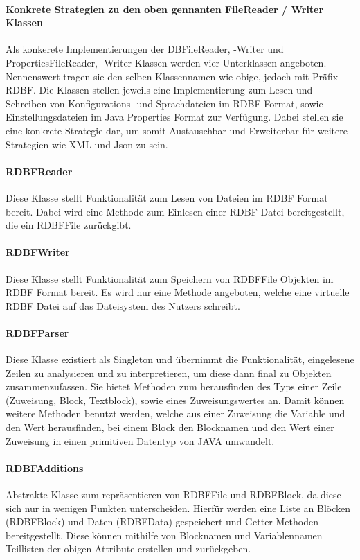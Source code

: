 \documentclass[parskip=full]{scrartcl}
\begin{document}
\paragraph{Konkrete Strategien zu den oben gennanten FileReader / Writer Klassen}
Als konkerete Implementierungen der DBFileReader, -Writer und PropertiesFileReader, -Writer Klassen werden vier Unterklassen angeboten.
Nennenswert tragen sie den selben Klassennamen wie obige, jedoch mit Präfix RDBF.
Die Klassen stellen jeweils eine Implementierung zum Lesen und Schreiben von Konfigurations- und Sprachdateien im RDBF Format, sowie Einstellungsdateien im Java Properties Format zur Verfügung.
Dabei stellen sie eine konkrete Strategie dar, um somit Austauschbar und Erweiterbar für weitere Strategien wie XML und Json zu sein.

\paragraph{RDBFReader}
Diese Klasse stellt Funktionalität zum Lesen von Dateien im RDBF Format bereit.
Dabei wird eine Methode zum Einlesen einer RDBF Datei bereitgestellt, die ein RDBFFile zurückgibt.
\paragraph{RDBFWriter}
Diese Klasse stellt Funktionalität zum Speichern von RDBFFile Objekten im RDBF Format bereit.
Es wird nur eine Methode angeboten, welche eine virtuelle RDBF Datei auf das Dateisystem des Nutzers schreibt.
\paragraph{RDBFParser}
Diese Klasse existiert als Singleton und übernimmt die Funktionalität, eingelesene Zeilen zu analysieren und zu interpretieren, um diese dann final zu Objekten zusammenzufassen.
Sie bietet Methoden zum herausfinden des Typs einer Zeile (Zuweisung, Block, Textblock), sowie eines Zuweisungswertes an.
Damit können weitere Methoden benutzt werden, welche aus einer Zuweisung die Variable und den Wert herausfinden, bei einem Block den Blocknamen und den Wert einer Zuweisung in einen primitiven Datentyp von JAVA umwandelt.
\paragraph{RDBFAdditions}
Abstrakte Klasse zum repräsentieren von RDBFFile und RDBFBlock, da diese sich nur in wenigen Punkten unterscheiden.
Hierfür werden eine Liste an Blöcken (RDBFBlock) und Daten (RDBFData) gespeichert und Getter-Methoden bereitgestellt.
Diese können mithilfe von Blocknamen und Variablennamen Teillisten der obigen Attribute erstellen und zurückgeben.
\end{document}
